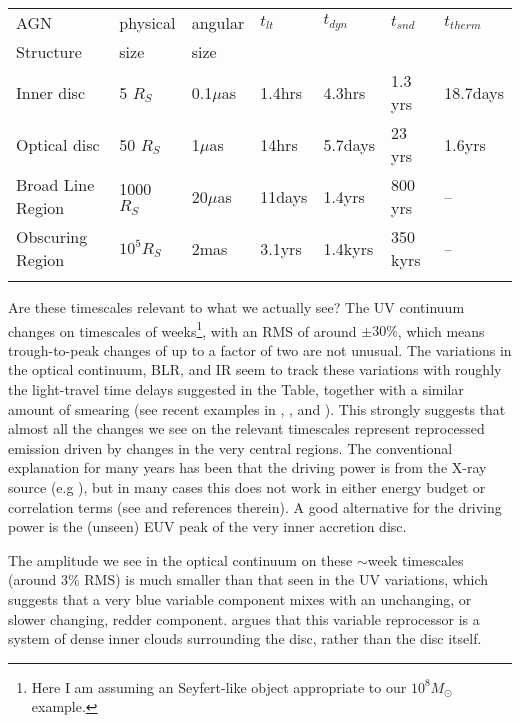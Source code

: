 \documentclass[11pt]{article}
\begin{document}
\begin{table}[!ht]
\begin{center}
\smallskip
{\small
\begin{tabular}{lllllll}  %

\hline
\noalign{\smallskip}
AGN & physical & angular & $t_{lt}$ & $t_{dyn}$ & $t_{snd}$ & $t_{therm}$ \\
\noalign{\smallskip}
Structure & size & size & &  &  & \\
\noalign{\smallskip}
\hline

\noalign{\smallskip}
Inner disc & 5 $R_S$ & 0.1$\mu$as & 1.4hrs & 4.3hrs & 1.3 yrs & 18.7days \\
\noalign{\smallskip}
Optical disc & 50 $R_S$ & 1$\mu$as & 14hrs & 5.7days & 23 yrs & 1.6yrs \\
\noalign{\smallskip}
Broad Line Region & 1000 $R_S$ & 20$\mu$as & 11days & 1.4yrs & 800 yrs & -- \\
\noalign{\smallskip}
Obscuring Region & $10^5 R_S$ & 2mas & 3.1yrs & 1.4kyrs & 350 kyrs & --  \\

\noalign{\smallskip}
\hline  
\end{tabular}
}
\end{center}
\end{table}

Are these timescales relevant to what we actually see? The UV continuum changes on timescales of weeks\footnote{Here I am assuming an Seyfert-like object appropriate to our $10^8 M_\odot$ example.}, with an RMS of around $\pm 30\%$, which means trough-to-peak changes of up to a factor of two are not unusual. The variations in the optical continuum, BLR, and IR seem to track these variations with roughly the light-travel time delays suggested in the Table, together with a similar amount of smearing (see recent examples in \citet{Edelson2015}, \cite{Grier2012}, and  \citet{Koshida2014}). This strongly suggests that almost all the changes we see on the relevant timescales represent reprocessed emission driven by changes in the very central regions. The conventional explanation for many years has been that the driving power is from the X-ray source (e.g \citet{McHardy2014}), but in many cases this does not work in either energy budget or correlation terms (see \citet{Lawrence2012} and references therein). A good alternative for the driving power is the (unseen) EUV peak of the very inner accretion disc.

The amplitude we see in the optical continuum on these $\sim$week timescales (around 3\%  RMS) is much smaller than that seen in the UV variations, which suggests that a very blue variable component mixes with an unchanging, or slower changing, redder component. \citet{Lawrence2012} argues that this variable reprocessor is a system of dense inner clouds surrounding the disc, rather than the disc itself.
\end{document}
